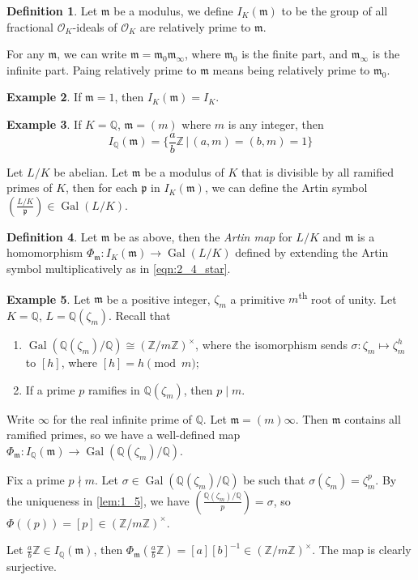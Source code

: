 \documentclass[11pt]{article}
\theoremstyle{definition}
\newtheorem{definition}{Definition}[section]
\newtheorem{example}[definition]{Example}
\theoremstyle{plain}
\theoremstyle{remark}
\DeclareMathOperator{\Gal}{Gal}
\newcommand{\ZZ}{\mathbb{Z}}
\newcommand{\QQ}{\mathbb{Q}}
\newcommand{\cO}{\mathcal{O}}
\newcommand{\fp}{\mathfrak{p}}
\newcommand{\fm}{\mathfrak{m}}
\newcommand{\leg}[2]{\left(\frac{#1}{#2}\right)}
\begin{document}
\begin{definition}\label{def:2_7}
    Let $\fm$ be a modulus, we define $I_K(\fm)$ to be the group of all fractional $\cO_K$-ideals of $\cO_K$ are relatively prime to $\fm$.
\end{definition}

For any $\fm$, we can write $\fm = \fm_0 \fm_\infty$, where $\fm_0$ is the finite part, and $\fm_\infty$ is the infinite part. Paing relatively prime to $\fm$ means being relatively prime to $\fm_0$.

\begin{example}\label{eg:2_8}
    If $\fm = 1$, then $I_K(\fm) = I_K$.
\end{example}

\begin{example}\label{eg:2_9}
    If $K = \QQ$, $\fm = (m)$ where $m$ is any integer, then
    \begin{equation*}
        I_\QQ(\fm) = \bigg\{ \frac{a}{b}\ZZ \,\bigg\vert\, (a, m) = (b, m) = 1 \bigg\}
    \end{equation*}
\end{example}

Let $L/K$ be abelian. Let $\fm$ be a modulus of $K$ that is divisible by all ramified primes of $K$, then for each $\fp$ in $I_K(\fm)$, we can define the Artin symbol $\leg{L/K}{\fp} \in \Gal(L/K)$.

\begin{definition}\label{def:2_10}
    Let $\fm$ be as above, then the \emph{Artin map} for $L/K$ and $\fm$ is a homomorphism $\Phi_{\fm} : I_K(\fm) \to \Gal(L/K)$ defined by extending the Artin symbol multiplicatively as in \eqref{eqn:2_4_star}.
\end{definition}

\begin{example}\label{eg:2_11}
    Let $\fm$ be a positive integer, $\zeta_m$ a primitive $m$\textsuperscript{th} root of unity. Let $K = \QQ$, $L = \QQ(\zeta_m)$. Recall that
    \begin{enumerate}
        \item $\Gal(\QQ(\zeta_m) / \QQ) \cong (\ZZ / m \ZZ)^\times$, where the isomorphism sends $\sigma : \zeta_m \mapsto \zeta_m^h$ to $[h]$, where $[h] = h \pmod{m}$;
        \item If a prime $p$ ramifies in $\QQ(\zeta_m)$, then $p \mid m$.
    \end{enumerate}
    Write $\infty$ for the real infinite prime of $\QQ$. Let $\fm = (m) \infty$. Then $\fm$ contains all ramified primes, so we have a well-defined map $\Phi_\fm : I_\QQ(\fm) \to \Gal(\QQ(\zeta_m) / \QQ)$.

    {\color{blue}
        Fix a prime $p \nmid m$. Let $\sigma \in \Gal(\QQ(\zeta_m) / \QQ)$ be such that $\sigma(\zeta_m) = \zeta_m^p$. By the uniqueness in \autoref{lem:1_5}, we have $\leg{\QQ(\zeta_m) / \QQ}{p} = \sigma$, so $\Phi((p)) = [p] \in (\ZZ / m \ZZ)^\times$.
    }

    Let $\frac{a}{b}\ZZ \in I_\QQ(\fm)$, then $\Phi_\fm(\frac{a}{b} \ZZ) = [a][b]^{-1} \in (\ZZ / m \ZZ)^\times$.
    The map is clearly surjective.
\end{example}
\end{document}
